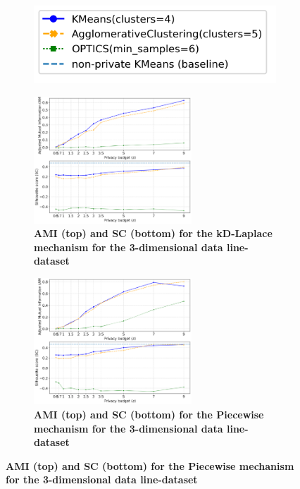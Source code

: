 \begin{figure}[H]
    \centering
    \begin{subfigure}{0.3\textwidth}
        \includegraphics[width=\textwidth]{Results/kd-laplace/kd-Laplace/line-dataset/legend_3.png}
    \end{subfigure}
    \begin{subfigure}{1\textwidth}
        \caption{\textbf{AMI (top) and SC (bottom) for the kD-Laplace mechanism for the 3-dimensional data line-dataset}}
        \centering
        \includegraphics[width=0.65\textwidth]{Results/kd-laplace/kd-Laplace/line-dataset/ami-and-sc_3_dimensions.png}
        \centering
    \end{subfigure}
    \begin{subfigure}{1\textwidth}
        \caption{\textbf{AMI (top) and SC (bottom) for the Piecewise mechanism for the 3-dimensional data line-dataset}}
        \centering
        \includegraphics[width=0.65\textwidth]{Results/kd-laplace/piecewise/line-dataset/ami-and-sc_3_dimensions.png}
    \end{subfigure}
    \label{fig:validation-line-dataset_comparison_3d-laplace}
\end{figure}
